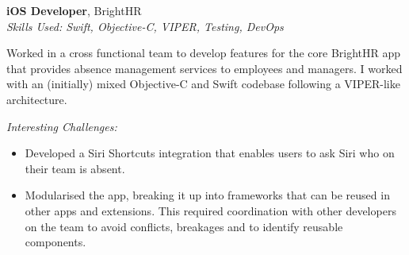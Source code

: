 \textbf{iOS Developer}, BrightHR \\
\textit{Skills Used: Swift, Objective-C, VIPER, Testing, DevOps}

Worked in a cross functional team to develop features for the core BrightHR app
that provides absence management services to employees and managers. I worked
with an (initially) mixed Objective-C and Swift codebase following a VIPER-like
architecture.

\medskip

\textit{Interesting Challenges:}

\smallskip

\begin{itemize}
\item Developed a Siri Shortcuts integration that enables users to ask Siri who
  on their team is absent.

\item Modularised the app, breaking it up into frameworks that can be reused in
  other apps and extensions. This required coordination with other developers on
  the team to avoid conflicts, breakages and to identify reusable components.

\end{itemize}

